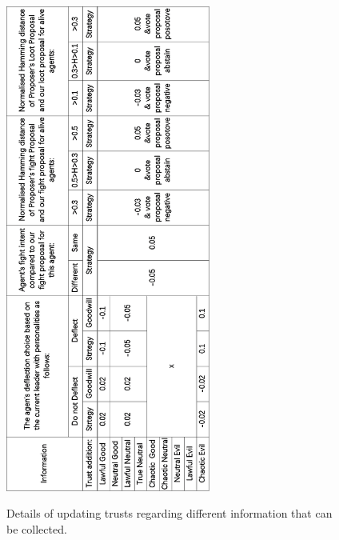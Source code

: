 \begin{figure}[htb]
    \caption{Details of updating trusts regarding different information that can be collected.}
    \includegraphics[width=0.60\textwidth]{008_team_5_agent_design/images/Information2Trusts.png}
    \label{fig:Information2Trusts}
\end{figure}
\clearpage

